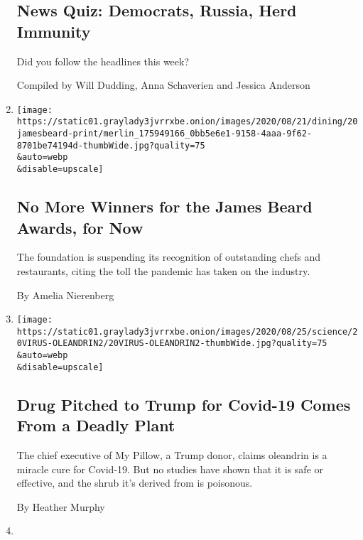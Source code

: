 \begin{enumerate}
{  \subsection{News Quiz: Democrats, Russia, Herd
  Immunity}\label{news-quiz-democrats-russia-herd-immunity}}

  Did you follow the headlines this week?

  Compiled by Will Dudding, Anna Schaverien and Jessica Anderson
\item
  \href{/2020/08/20/dining/james-beard-awards.html}{}

  \texttt{[image: https://static01.graylady3jvrrxbe.onion/images/2020/08/21/dining/20jamesbeard-print/merlin\_175949166\_0bb5e6e1-9158-4aaa-9f62-8701be74194d-thumbWide.jpg?quality=75\\\&auto=webp\\\&disable=upscale]}

  \hypertarget{no-more-winners-for-the-james-beard-awards-for-now}{%
  \subsection{No More Winners for the James Beard Awards, for
  Now}\label{no-more-winners-for-the-james-beard-awards-for-now}}

  The foundation is suspending its recognition of outstanding chefs and
  restaurants, citing the toll the pandemic has taken on the industry.

  By Amelia Nierenberg
\item
  \href{/2020/08/20/health/covid-oleandrin-trump-mypillow.html}{}

  \texttt{[image: https://static01.graylady3jvrrxbe.onion/images/2020/08/25/science/20VIRUS-OLEANDRIN2/20VIRUS-OLEANDRIN2-thumbWide.jpg?quality=75\\\&auto=webp\\\&disable=upscale]}

  \hypertarget{drug-pitched-to-trump-for-covid-19-comes-from-a-deadly-plant}{%
  \subsection{Drug Pitched to Trump for Covid-19 Comes From a Deadly
  Plant}\label{drug-pitched-to-trump-for-covid-19-comes-from-a-deadly-plant}}

  The chief executive of My Pillow, a Trump donor, claims oleandrin is a
  miracle cure for Covid-19. But no studies have shown that it is safe
  or effective, and the shrub it's derived from is poisonous.

  By Heather Murphy
\item
  \href{/2020/08/20/business/media/unhinged-russell-crowe-theaters.html}{}


\end{enumerate}
